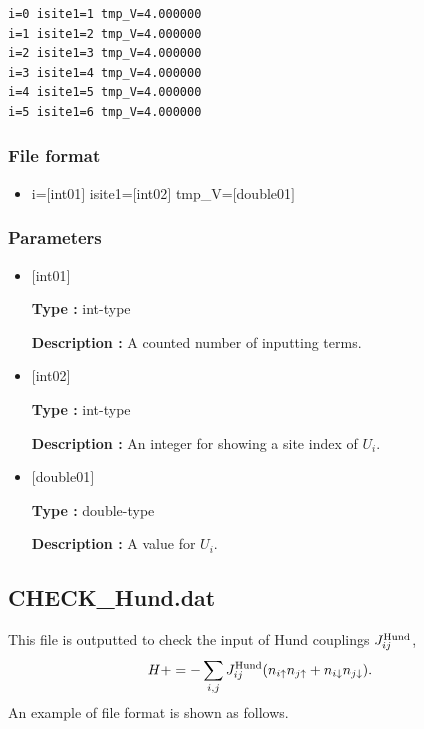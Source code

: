 \begin{minipage}{12.5cm}
\begin{screen}
\begin{verbatim}
i=0 isite1=1 tmp_V=4.000000 
i=1 isite1=2 tmp_V=4.000000 
i=2 isite1=3 tmp_V=4.000000 
i=3 isite1=4 tmp_V=4.000000 
i=4 isite1=5 tmp_V=4.000000 
i=5 isite1=6 tmp_V=4.000000 
\end{verbatim}
\end{screen}
\end{minipage}

\subsubsection{File format}
 \begin{itemize}
   \item  i=$[$int01$]$ isite1=$[$int02$]$  tmp\_V=$[$double01$]$ 
 \end{itemize}
 
\subsubsection{Parameters}
 \begin{itemize}

    \item  $[$int01$]$ 
   
    {\bf Type :} int-type

   {\bf Description :} A counted number of inputting terms.
      
   \item  $[$int02$]$
   
    {\bf Type :} int-type

    {\bf Description :}   An integer for showing a site index of $U_i$.
    
   \item  $[$double01$]$ 
   
    {\bf Type :} double-type

   {\bf Description :} A value for $U_i$.
\end{itemize}

\newpage
\subsection{CHECK\_Hund.dat}
This file is outputted to check the input of Hund couplings $J_{ij}^{\rm Hund}$,
\begin{align}
H += -\sum_{i,j}J_{ij}^{\rm Hund} (n_{i\uparrow}n_{j\uparrow}+n_{i\downarrow}n_{j\downarrow}).
\end{align}
An example of file format is shown as follows.

